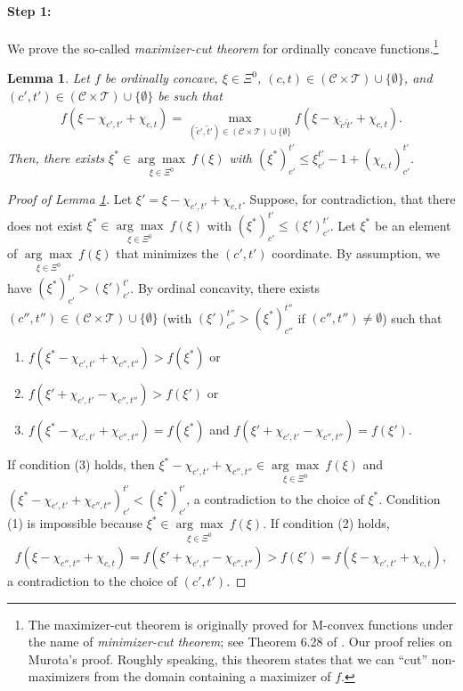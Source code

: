 \documentclass[12pt]{amsart}
\newtheorem{lemma}{Lemma}
\theoremstyle{remark}
\begin{document}
\paragraph{Step 1: } We prove the so-called {\it maximizer-cut theorem} for ordinally concave functions.\footnote{The maximizer-cut theorem is originally proved for M-convex functions under the name of {\it minimizer-cut theorem}; see Theorem 6.28 of \cite{Murota:SIAM:2003}. Our proof relies on Murota's proof. Roughly speaking, this theorem states that we can ``cut'' non-maximizers from the domain containing a maximizer of $f$.}
\begin{lemma}\label{lem:maximizer-cut-1}
Let $f$ be ordinally concave, $\xi\in \Xi^0$, $(c,t)\in (\mathcal{C}\times \mathcal{T})\cup\{\emptyset\}$, and $(c',t')\in (\mathcal{C}\times \mathcal{T})\cup\{\emptyset\}$ be such that
\begin{align*}
f(\xi-\chi_{c',t'}+\chi_{c,t})=\max_{(\tilde c', \tilde t')\in (\mathcal{C}\times \mathcal{T})\cup \{\emptyset\}}f(\xi-\chi_{\tilde c' \tilde t'}+\chi_{c,t}).
\end{align*}
Then, there exists $\xi^*\in \underset {\xi\in \Xi^0} {\arg\max} \: f(\xi)$ with $(\xi^*)_{c'}^{t'}\leq \xi_{c'}^{t'}-1+(\chi_{c,t})_{c'}^{t'}$.
\end{lemma}
\begin{proof}[Proof of Lemma \ref{lem:maximizer-cut-1}]\renewcommand{\qedsymbol}{$\blacksquare$}
Let $\xi'=\xi-\chi_{c',t'}+\chi_{c,t}$. Suppose, for contradiction, that there does not exist $\xi^*\in \underset {\xi\in \Xi^0} {\arg\max} \: f(\xi)$ with $(\xi^*)_{c'}^{t'}\leq (\xi')_{c'}^{t'}$. Let $\xi^*$ be an element of $\underset {\xi\in \Xi^0} {\arg\max} \: f(\xi)$ that minimizes the $(c',t')$ coordinate. By assumption, we have $(\xi^*)_{c'}^{t'}>(\xi')_{c'}^{t'}$. By ordinal concavity, there exists $(c'', t'') \in (\mathcal{C}\times \mathcal{T})\cup\{\emptyset\}$ (with $(\xi')_{c''}^{t''}>(\xi^*)_{c''}^{t''}$ if $(c'',t'')\neq \emptyset$) such that
\begin{enumerate}
\item $f(\xi^*-\chi_{c',t'}+\chi_{c'',t''})>f(\xi^*)$ or
\item $f(\xi'+\chi_{c',t'}-\chi_{c'',t''})>f(\xi')$ or
\item $f(\xi^*-\chi_{c',t'}+\chi_{c'',t''})=f(\xi^*)$ and $f(\xi'+\chi_{c',t'}-\chi_{c'',t''})=f(\xi')$.
\end{enumerate}
If condition (3) holds, then $\xi^*-\chi_{c',t'}+\chi_{c'',t''}\in \underset {\xi\in \Xi^0} {\arg\max} \: f(\xi)$ and $(\xi^*-\chi_{c',t'}+\chi_{c'',t''})_{c'}^{t'}<(\xi^*)_{c'}^{t'}$, a contradiction to the choice of $\xi^*$. Condition (1) is impossible because $\xi^*\in \underset {\xi\in \Xi^0} {\arg\max} \: f(\xi)$. If condition (2) holds,
\begin{align*}
f(\xi-\chi_{c'',t''}+\chi_{c,t})=f(\xi'+\chi_{c',t'}-\chi_{c'',t''})>f(\xi')=f(\xi-\chi_{c',t'}+\chi_{c,t}),
\end{align*}
a contradiction to the choice of $(c',t')$.
\end{proof}
\end{document}
